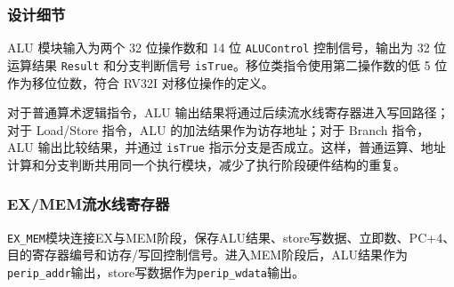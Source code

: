 \documentclass[UTF8,a4paper,12pt]{ctexart}
\newcommand{\code}[1]{\texttt{#1}}
\begin{document}
\subsubsection*{设计细节}

ALU 模块输入为两个 32 位操作数和 14 位 \code{ALUControl} 控制信号，输出为 32 位运算结果 \code{Result} 和分支判断信号 \code{isTrue}。移位类指令使用第二操作数的低 5 位作为移位位数，符合 RV32I 对移位操作的定义。

对于普通算术逻辑指令，ALU 输出结果将通过后续流水线寄存器进入写回路径；对于 Load/Store 指令，ALU 的加法结果作为访存地址；对于 Branch 指令，ALU 输出比较结果，并通过 \code{isTrue} 指示分支是否成立。这样，普通运算、地址计算和分支判断共用同一个执行模块，减少了执行阶段硬件结构的重复。

\subsubsection{EX/MEM流水线寄存器}

\code{EX\_MEM}模块连接EX与MEM阶段，保存ALU结果、store写数据、立即数、PC+4、目的寄存器编号和访存/写回控制信号。进入MEM阶段后，ALU结果作为\code{perip\_addr}输出，store写数据作为\code{perip\_wdata}输出。
\end{document}
